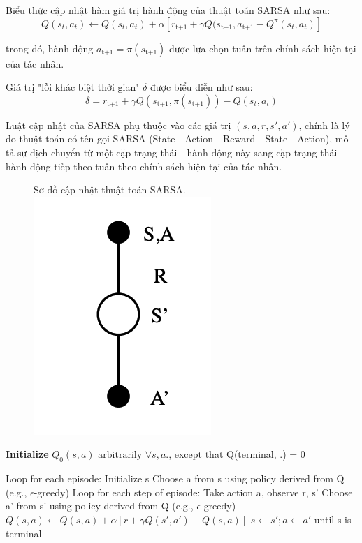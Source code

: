 \documentclass{uetgraduation}
\begin{document}
Biểu thức cập nhật hàm giá trị hành động của thuật toán SARSA như sau:
\begin{equation}
    Q(s_t, a_t) \leftarrow Q(s_t, a_t) + \alpha [r_\text{t+1} + \gamma Q (s_\text{t+1}, a_\text{t+1} - Q^\pi(s_t, a_t)]
\end{equation}

trong đó, hành động $a_\text{t+1} = \pi(s_\text{t+1})$ được lựa chọn tuân trên chính sách hiện tại của tác nhân.

Giá trị "lỗi khác biệt thời gian" $\delta$ được biểu diễn như sau:
\begin{equation}
    \delta = r_\text{t+1} + \gamma Q (s_\text{t+1}, \pi(s_\text{t+1})) - Q (s_t, a_t)
\end{equation}

Luật cập nhật của SARSA phụ thuộc vào các giá trị $(s, a, r, s', a')$, chính là lý do thuật toán có tên gọi SARSA (State - Action - Reward - State - Action),
mô tả sự dịch chuyển từ một cặp trạng thái - hành động này sang cặp trạng thái hành động tiếp theo tuân theo chính sách hiện tại của tác nhân.
\begin{figure}{Sơ đồ cập nhật thuật toán SARSA.}
    \centering
    \includegraphics[scale=0.5]{sarsa_diagram}
    \label{fig:sarsa}
\end{figure}

\begin{algorithm}
    \caption{Thuật toán SARSA}\label{alg:sarsa}
    \begin{algorithmic}[1]
    \State \textbf{Initialize } $Q_0(s,a) \text{ arbitrarily } \forall s,a.$, except that Q(terminal, .) = 0
        
    \State Loop for each episode:
        \State \quad Initialize s
        \State \quad Choose a from s using policy derived from Q (e.g., $\epsilon$-greedy)
        \State \quad Loop for each step of episode:
            \State \quad \quad Take action a, observe r, s'
            \State \quad \quad Choose a' from s' using policy derived from Q (e.g., $\epsilon$-greedy)
            \State \quad \quad $Q(s, a) \leftarrow Q(s, a) + \alpha [r + \gamma Q (s', a') - Q(s, a)]$
            \State \quad \quad $s \leftarrow s'; a \leftarrow a'$
        \State \quad until s is terminal
\end{algorithmic}
\end{algorithm}
\end{document}
